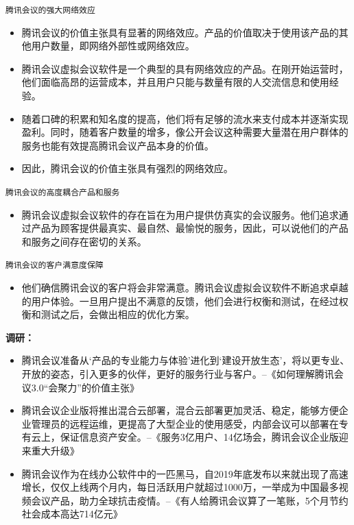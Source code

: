 \documentclass[a4paper,12pt]{article}
\begin{document}
\texttt{腾讯会议的强大网络效应}

\begin{itemize}
  \item 腾讯会议的价值主张具有显著的网络效应。产品的价值取决于使用该产品的其他用户数量，即网络外部性或网络效应。
  
  \item 腾讯会议虚拟会议软件是一个典型的具有网络效应的产品。在刚开始运营时，他们面临高昂的运营成本，并且用户只能与数量有限的人交流信息和使用经验。
  
  \item 随着口碑的积累和知名度的提高，他们将有足够的流水来支付成本并逐渐实现盈利。同时，随着客户数量的增多，像公开会议这种需要大量潜在用户群体的服务也能有效提高腾讯会议产品本身的价值。
  
  \item 因此，腾讯会议的价值主张具有强烈的网络效应。
\end{itemize}

\texttt{腾讯会议的高度耦合产品和服务}

\begin{itemize}
  \item 腾讯会议虚拟会议软件的存在旨在为用户提供仿真实的会议服务。他们追求通过产品为顾客提供最真实、最自然、最愉悦的服务，因此，可以说他们的产品和服务之间存在密切的关系。
\end{itemize}

\texttt{腾讯会议的客户满意度保障}

\begin{itemize}
  \item 他们确信腾讯会议的客户将会非常满意。腾讯会议虚拟会议软件不断追求卓越的用户体验。一旦用户提出不满意的反馈，他们会进行权衡和测试，在经过权衡和测试之后，会做出相应的优化⽅案。
\end{itemize}
\textbf{调研：}
\begin{itemize}
    \item 腾讯会议准备从‘产品的专业能力与体验’进化到‘建设开放生态’，将以更专业、开放的姿态，引入更多的伙伴，更好的服务行业与客户。--《如何理解腾讯会议3.0“会聚力”的价值主张》
    \item 腾讯会议企业版将推出混合云部署，混合云部署更加灵活、稳定，能够方便企业管理员的远程运维，更提高了大型企业的使用感受，内部会议可以部署在专有云上，保证信息资产安全。--《服务3亿用户、14亿场会，腾讯会议企业版迎来重大升级》
    \item 腾讯会议作为在线办公软件中的一匹黑马，自2019年底发布以来就出现了高速增长，仅仅上线两个月内，每日活跃用户就超过1000万，一举成为中国最多视频会议产品，助力全球抗击疫情。--《有人给腾讯会议算了一笔账，5个月节约社会成本高达714亿元》
\end{itemize}
\end{document}
